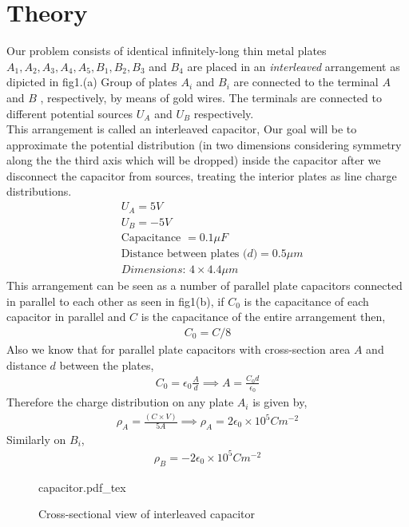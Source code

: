 \section{Theory}
Our problem consists of identical infinitely-long thin metal plates $A_1,A_2,A_3,A_4,A_5,B_1,B_2,B_3 $ and $B_4$ are placed in an \textit{interleaved} arrangement as dipicted in fig1.(a) Group of plates $A_i$ and $B_i$ are connected to the terminal $A$ and $B$ , respectively, by means of gold wires. The terminals are connected to different potential sources $U_A$ and $U_B$ respectively. \\
This arrangement is called an interleaved capacitor, Our goal will be to approximate the potential distribution (in two dimensions considering symmetry along the the third axis which will be dropped) inside the capacitor after we disconnect the capacitor from sources, treating the interior plates as line charge distributions.
\begin{align*}
    &U_A = 5V \\
    &U_B = -5V \\
    &\text{Capacitance } = 0.1\mu F\\
    &\text{Distance between plates ($d$)} = 0.5\mu m \\
    &\textit{Dimensions: } 4 \times 4.4 \mu m  
\end{align*}
This arrangement can be seen as a number of parallel plate capacitors connected in parallel to each other as seen in fig1(b),
if $C_0$ is the capacitance of each capacitor in parallel and $C$ is the capacitance of the entire arrangement then,
\begin{align*}
    C_0 = C/8
\end{align*}
Also we know that for parallel plate capacitors with cross-section area $A$ and distance $d$ between the plates,
\begin{align}
    C_0 = \epsilon_0 \frac{A}{d} \implies A = \frac{C_0d}{\epsilon_0}
\end{align}
Therefore the charge distribution on any plate $A_i$ is given by,
\begin{align}
    \rho_A = \frac{(C \times V )}{5A} \implies \rho_A = 2\epsilon_0 \times 10^5C m^{-2} 
\end{align}
Similarly on $B_i$,
\begin{align}
    \rho_B = -2\epsilon_0 \times 10^5C m^{-2} 
\end{align}

\begin{figure}[ht]
    \centering
    \def\svgwidth{0.6\textwidth}
    {capacitor.pdf_tex}
    \caption{Cross-sectional view of interleaved capacitor}
    \label{fig:cap}
\end{figure}

